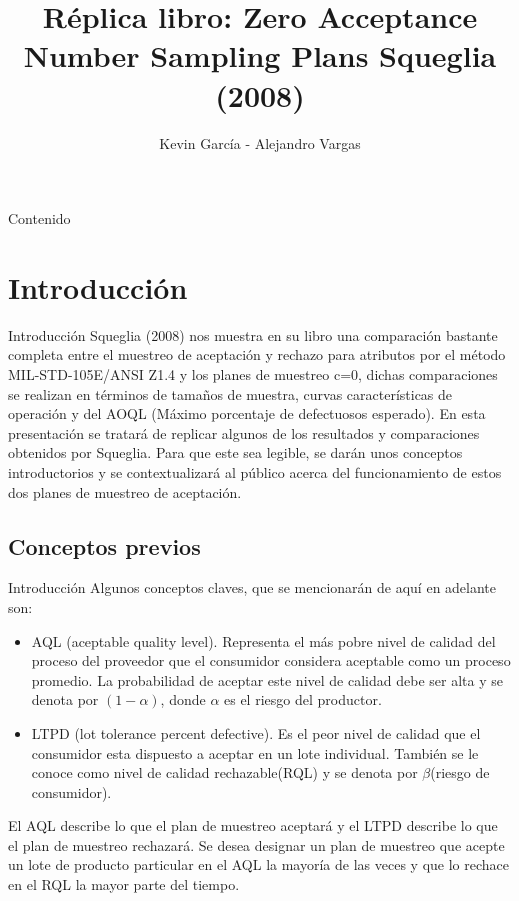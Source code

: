 \documentclass[10pt]{beamer}
\author{Kevin García - Alejandro Vargas}
\title{Réplica libro: Zero Acceptance Number Sampling Plans Squeglia (2008)}
\begin{document}
\begin{frame}[plain]
\maketitle
\end{frame}

\begin{frame}{Contenido}
\tableofcontents
\end{frame}

\section{Introducción}
\begin{frame}{Introducción}
Squeglia (2008)\cite{A0} nos muestra en su libro una comparación bastante completa entre el muestreo de aceptación y rechazo para atributos por el método MIL-STD-105E/ANSI Z1.4 y los planes de muestreo c=0, dichas comparaciones se realizan en términos de tamaños de muestra, curvas características de operación y del AOQL (Máximo porcentaje de defectuosos esperado). En esta presentación se tratará de replicar algunos de los resultados y comparaciones obtenidos por Squeglia. Para que este sea legible, se darán unos conceptos introductorios y se contextualizará al público acerca del funcionamiento de estos dos planes de muestreo de aceptación.
\end{frame}

\subsection{Conceptos previos}
\begin{frame}{Introducción}
Algunos conceptos claves, que se mencionarán de aquí en adelante son:
\begin{itemize}
\justifying
\item AQL (aceptable quality level). Representa el más pobre nivel de calidad del proceso del proveedor que el consumidor considera aceptable como un proceso promedio. La probabilidad de aceptar este nivel de calidad debe ser alta y se denota por $(1-\alpha)$, donde $\alpha$ es el riesgo del productor.
\item LTPD (lot tolerance percent defective). Es el peor nivel de calidad que el consumidor esta dispuesto a aceptar en un lote individual. También se le conoce como nivel de calidad rechazable(RQL) y se denota por $\beta$(riesgo de consumidor).
\end{itemize}
El AQL describe lo que el plan de muestreo aceptará y el LTPD describe lo que el plan de muestreo rechazará. Se desea designar un plan de muestreo que acepte un lote de producto particular en el AQL la mayoría de las veces y que lo rechace en el RQL la mayor parte del tiempo.
\end{frame}
\end{document}
